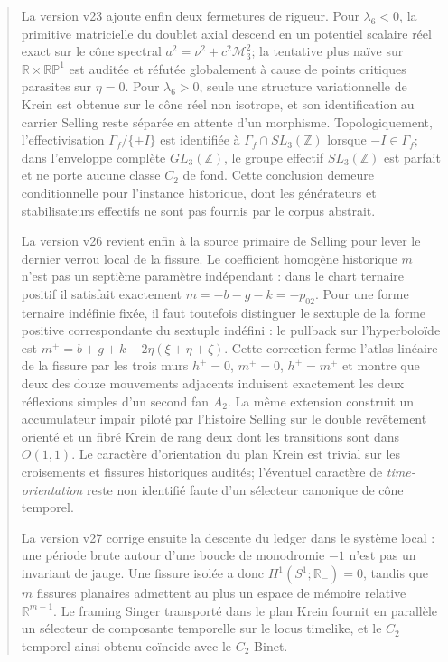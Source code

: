 \documentclass[11pt,a4paper]{article}
\begin{document}
\begin{abstract}
La version v23 ajoute enfin deux fermetures de rigueur. Pour $\lambda_6<0$, la primitive matricielle du doublet axial descend en un potentiel scalaire réel exact sur le cône spectral $a^2=\nu^2+c^2\mathcal M_3^2$; la tentative plus naïve sur $\mathbb R\times\mathbb{RP}^1$ est auditée et réfutée globalement à cause de points critiques parasites sur $\eta=0$. Pour $\lambda_6>0$, seule une structure variationnelle de Krein est obtenue sur le cône réel non isotrope, et son identification au carrier Selling reste séparée en attente d'un morphisme. Topologiquement, l'effectivisation $\Gamma_f/\{\pm I\}$ est identifiée à $\Gamma_f\cap SL_3(\mathbb Z)$ lorsque $-I\in\Gamma_f$; dans l'enveloppe complète $GL_3(\mathbb Z)$, le groupe effectif $SL_3(\mathbb Z)$ est parfait et ne porte aucune classe $C_2$ de fond. Cette conclusion demeure conditionnelle pour l'instance historique, dont les générateurs et stabilisateurs effectifs ne sont pas fournis par le corpus abstrait.


La version v26 revient enfin à la source primaire de Selling pour lever le dernier verrou local de la fissure. Le coefficient homogène historique $m$ n'est pas un septième paramètre indépendant : dans le chart ternaire positif il satisfait exactement $m=-b-g-k=-p_{02}$. Pour une forme ternaire indéfinie fixée, il faut toutefois distinguer le sextuple de la forme positive correspondante du sextuple indéfini : le pullback sur l'hyperboloïde est $m^+=b+g+k-2\eta(\xi+\eta+\zeta)$. Cette correction ferme l'atlas linéaire de la fissure par les trois murs $h^+=0$, $m^+=0$, $h^+=m^+$ et montre que deux des douze mouvements adjacents induisent exactement les deux réflexions simples d'un second fan $A_2$. La même extension construit un accumulateur impair piloté par l'histoire Selling sur le double revêtement orienté et un fibré Krein de rang deux dont les transitions sont dans $O(1,1)$. Le caractère d'orientation du plan Krein est trivial sur les croisements et fissures historiques audités; l'éventuel caractère de \emph{time-orientation} reste non identifié faute d'un sélecteur canonique de cône temporel.


La version v27 corrige ensuite la descente du ledger dans le système local : une période brute autour d'une boucle de monodromie $-1$ n'est pas un invariant de jauge. Une fissure isolée a donc $H^1(S^1;\mathbb R_-)=0$, tandis que $m$ fissures planaires admettent au plus un espace de mémoire relative $\mathbb R^{m-1}$. Le framing Singer transporté dans le plan Krein fournit en parallèle un sélecteur de composante temporelle sur le locus timelike, et le $C_2$ temporel ainsi obtenu coïncide avec le $C_2$ Binet.


\end{abstract}
\end{document}
